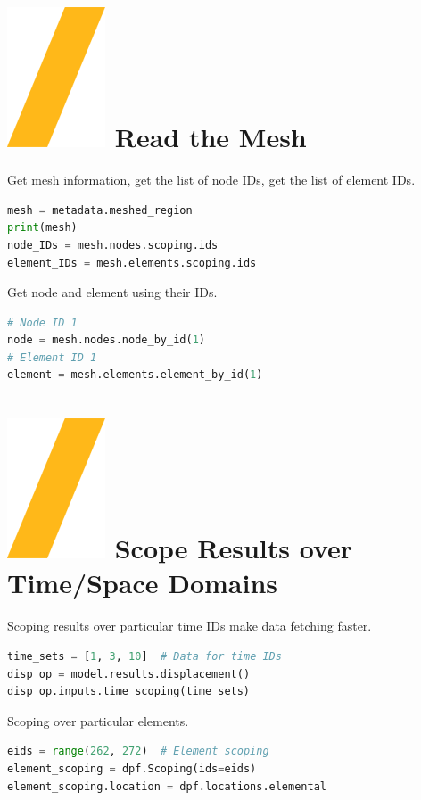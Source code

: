 \documentclass[9pt,landscape]{article}
\begin{document}
\begin{multicols}{3}
\vfill
\columnbreak

\section{\includegraphics[height=\fontcharht\font`\S]{slash.png} Read the Mesh }
Get mesh information, get the list of node IDs, get the list of element IDs.
\begin{lstlisting}[language=Python]
mesh = metadata.meshed_region
print(mesh)
node_IDs = mesh.nodes.scoping.ids
element_IDs = mesh.elements.scoping.ids
\end{lstlisting}

Get node and element using their IDs.
\begin{lstlisting}[language=Python]
# Node ID 1
node = mesh.nodes.node_by_id(1)
# Element ID 1
element = mesh.elements.element_by_id(1)
\end{lstlisting}


\section{\includegraphics[height=\fontcharht\font`\S]{slash.png} Scope Results over Time/Space Domains }
Scoping results over particular time IDs make data fetching faster.
\begin{lstlisting}[language=Python]
time_sets = [1, 3, 10]  # Data for time IDs
disp_op = model.results.displacement()
disp_op.inputs.time_scoping(time_sets)
\end{lstlisting}

Scoping over particular elements.
\begin{lstlisting}[language=Python]
eids = range(262, 272)  # Element scoping
element_scoping = dpf.Scoping(ids=eids)
element_scoping.location = dpf.locations.elemental


\end{lstlisting}
\end{multicols}
\end{document}
